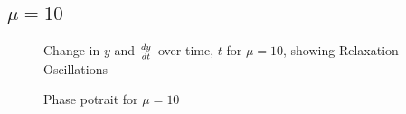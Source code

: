 \documentclass{article}
\begin{document}
\subsection{$\mu=10$}
\begin{figure}[H]
\centering 
\noindent{}%
\caption{Change in $y$ and $dy \over dt$  over time, $t$ for $\mu=10$, showing Relaxation Oscillations}
\end{figure}
\begin{figure}[H]
\centering 
\noindent{}%
\caption{Phase potrait for $\mu=10$}
\end{figure}
\end{document}

